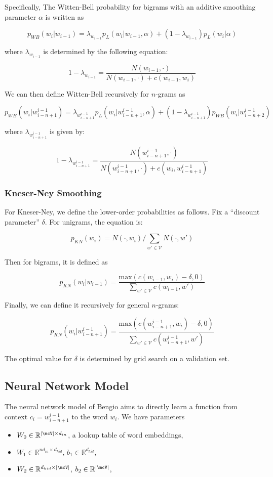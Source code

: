 \documentclass[11pt]{article}
\begin{document}
Specifically, The Witten-Bell probability for bigrams with an additive smoothing parameter $\alpha$ is written as

$$p_{WB}(w_i|w_{i-1}) = \lambda_{w_{i-1}} p_L(w_i|w_{i-1}, \alpha) + (1-\lambda_{w_{i-1}}) p_L(w_i| \alpha)$$

where $\lambda_{w_{i-1}}$ is determined by the following equation:

$$1 - \lambda_{w_{i-1}} = \frac{N(w_{i-1}, \cdot)}{N(w_{i-1}, \cdot) + c(w_{i-1}, w_i)}$$

We can then define Witten-Bell recursively for $n$-grams as

$$p_{WB}(w_i|w^{i-1}_{i-n+1}) = \lambda_{w^{i-1}_{i-n+1}} p_L(w_i|w^{i-1}_{i-n+1}, \alpha) + (1-\lambda_{w^{i-1}_{i-n+1}}) p_{WB}(w_i|w^{i-1}_{i-n+2})$$

where $\lambda_{w^{i-1}_{i-n+1}}$ is given by:

$$1 - \lambda_{w^{i-1}_{i-n+1}} = \frac{N(w^{i-1}_{i-n+1}, \cdot)}{N(w^{i-1}_{i-n+1}, \cdot) + c(w_i, w^{i-1}_{i-n+1})}$$ 

\subsubsection{Kneser-Ney Smoothing}

For Kneser-Ney, we define the lower-order probabilities as follows. Fix a ``discount parameter'' $\delta$. For unigrams, the equation is:

$$p_{KN}(w_i) = N(\cdot, w_i)/\sum_{w' \in \mathcal{V}} N(\cdot, w')$$

Then for bigrams, it is defined as 

$$p_{KN}(w_i | w_{i-1}) = \frac{\text{max}(c(w_{i-1}, w_i) - \delta, 0)}{\sum_{w' \in \mathcal{V}} c(w_{i-1}, w')}$$

Finally, we can define it recursively for general $n$-grams:

$$p_{KN}(w_i | w^{i-1}_{i-n+1}) = \frac{\text{max}(c(w^{i-1}_{i-n+1}, w_i) - \delta, 0)}{\sum_{w' \in \mathcal{V}}c(w^{i-1}_{i-n+1}, w')}$$

The optimal value for $\delta$ is determined by grid search on a validation set. 

\subsection{Neural Network Model}

The neural network model of Bengio aims to directly learn a function from context $c_i = w_{i-n+1}^{i-1}$ to the word $w_i$. We have parameters
\begin{itemize}
\item $W_0 \in \mathbb{R}^{|\mcV| \times d_{in}}$, a lookup table of word embeddings,
\item $W_1 \in \mathbb{R}^{nd_{in} \times d_{hid}}$, $b_1 \in \mathbb{R}^{d_{hid}}$,
\item $W_2 \in \mathbb{R}^{d_{hid} \times |\mcV|}$, $b_2 \in \mathbb{R}^{|\mcV|}$,
\end{itemize}
\end{document}
